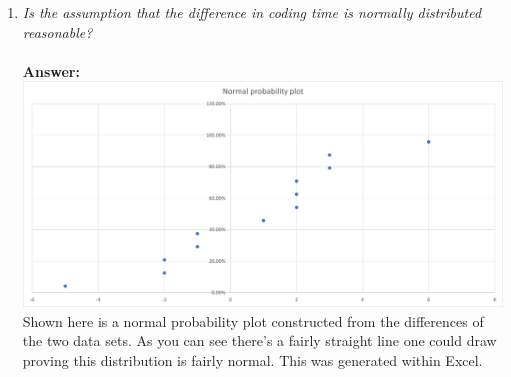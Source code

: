 \documentclass[11pt]{article}
\begin{document}
\begin{enumerate}
\item \emph{Is the assumption that the difference in coding time is normally distributed reasonable?}\\
\\\textbf{Answer:}\\
\includegraphics[scale=.65]{probplot.png}\\
Shown here is a normal probability plot constructed from the differences of the two data sets. As you can see there's a fairly straight line one could draw proving this distribution is fairly normal. This was generated within Excel.


\end{enumerate}
\end{document}
